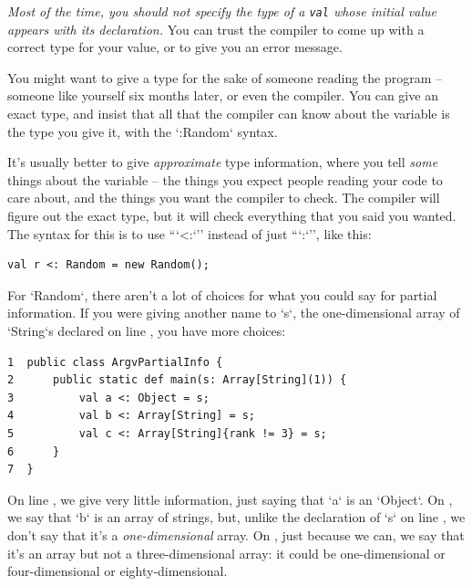 \begin{description}
\begin{nonquote}
{\em Most of the time, you should not
specify the type of a {\tt val} whose initial value appears with its
declaration.}  
You can trust the compiler to come up with a correct type for your value, 
or to give you an error message.  

You might want to give a type for the sake of someone reading the program --
someone like yourself six months later, or even the compiler.  You can give an
exact type, and insist that all that the compiler can know about the variable
is the type you give it, with the \xcd`:Random` syntax.  

It's usually better to give {\em approximate} type information, where you tell
{\em some} things about the variable -- the things you expect people reading
your code to care about, and the things you want the compiler to check.  The
compiler will figure out the exact type, but it will check everything that you
said you wanted.  The syntax for this is to use ``\xcd`<:`'' instead of just
``\xcd`:`'', like this:
\begin{verbatim}
val r <: Random = new Random();
\end{verbatim}
For \xcd`Random`, there aren't a lot of choices for what you could say for
partial information.  If you were giving another name to \xcd`s`, the
one-dimensional array of \xcd`String`s declared on line , you
have more choices:
\begin{verbatim}
1  public class ArgvPartialInfo {
2      public static def main(s: Array[String](1)) {
3          val a <: Object = s; 
4          val b <: Array[String] = s;
5          val c <: Array[String]{rank != 3} = s;
6      }
7  }
\end{verbatim}

On line , we give very little information, just saying
that \xcd`a` is an \xcd`Object`.  On , we say that
\xcd`b` is an array of strings, but, unlike the declaration of \xcd`s` on line
, we don't say that it's a {\em one-dimensional} array.  
On , just because we can, we say that it's 
an array but not a three-dimensional array: it could be one-dimensional or
four-dimensional or eighty-dimensional.  


\end{nonquote}
\end{description}

